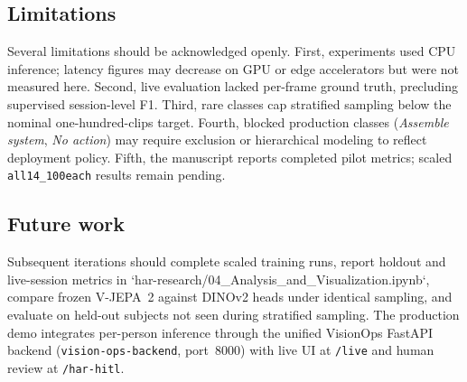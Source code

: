 \subsection{Limitations}

Several limitations should be acknowledged openly.
First, experiments used CPU inference; latency figures may decrease on GPU or edge accelerators but were not measured here.
Second, live evaluation lacked per-frame ground truth, precluding supervised session-level F1.
Third, rare \inhard{} classes cap stratified sampling below the nominal one-hundred-clips target.
Fourth, blocked production classes (\emph{Assemble system}, \emph{No action}) may require exclusion or hierarchical modeling to reflect deployment policy.
Fifth, the manuscript reports completed pilot metrics; scaled \texttt{all14\_100each} results remain pending.

\subsection{Future work}

Subsequent iterations should complete scaled training runs, report holdout and live-session metrics in `har-research/04_Analysis_and_Visualization.ipynb`, compare frozen V-JEPA~2 against DINOv2 heads under identical sampling, and evaluate on held-out \inhard{} subjects not seen during stratified sampling.
The production demo integrates per-person inference through the unified VisionOps FastAPI backend (\texttt{vision-ops-backend}, port~8000) with live UI at \texttt{/live} and human review at \texttt{/har-hitl}.

